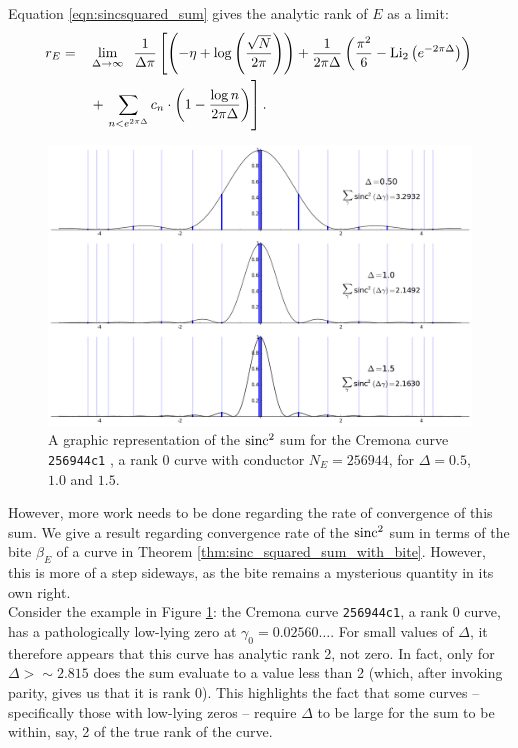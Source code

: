 Equation \ref{eqn:sincsquared_sum} gives the analytic rank of $E$ as a limit:
\begin{align}
r_E = \quad & \lim_{\Delta \to \infty} \;\; \frac{1}{\Delta \pi}\left[\left(-\eta + \log\left(\frac{\sqrt{N}}{2\pi}\right)\right)+ \frac{1}{2\pi \Delta}\left(\frac{\pi^2}{6} - \operatorname{Li}_2\left(e^{-2\pi \Delta}\right)\right)  \right. \nonumber \\
&+ \left.\sum_{n<e^{2\pi \Delta}} c_n \cdot \left(1-\frac{\log n}{2\pi \Delta}\right)\right].
\end{align}

\begin{figure}[!h]
    \centering
    \includegraphics[width=1.0\textwidth]{graphics/256944c1_zero_sum.png}
    \caption{A graphic representation of the $\operatorname{sinc}^2$ sum for the Cremona curve {\tt 256944c1} , a rank 0 curve with conductor $N_E=256944$, for $\Delta = 0.5$, $1.0$ and $1.5$.}
    \label{fig:256944c1_zero_sum}
\end{figure}

However, more work needs to be done regarding the rate of convergence of this sum. We give a result regarding convergence rate of the $\operatorname{sinc}^2$ sum in terms of the bite $\beta_E$ of a curve in Theorem \ref{thm:sinc_squared_sum_with_bite}. However, this is more of a step sideways, as the bite remains a mysterious quantity in its own right. \\

Consider the example in Figure \ref{fig:256944c1_zero_sum}: the Cremona curve {\tt 256944c1}, a rank 0 curve, has a pathologically low-lying zero at $\gamma_0 = 0.02560\ldots$. For small values of $\Delta$, it therefore appears that this curve has analytic rank 2, not zero. In fact, only for $\Delta>\sim 2.815$ does the sum evaluate to a value less than 2 (which, after invoking parity, gives us that it is rank 0). This highlights the fact that some curves -- specifically those with low-lying zeros -- require $\Delta$ to be large for the sum to be within, say, 2 of the true rank of the curve. \\

